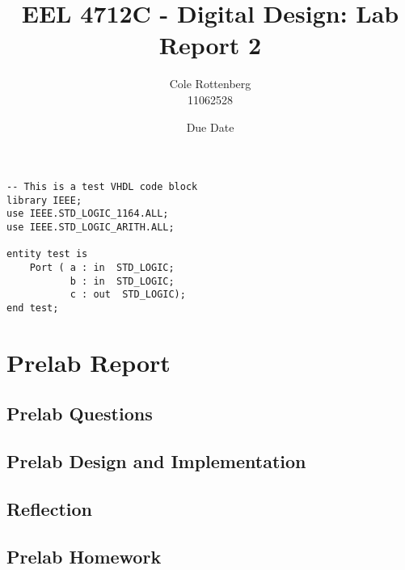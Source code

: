 \documentclass{article}
\title{EEL 4712C - Digital Design: Lab Report 2}
\author{Cole Rottenberg \\ 11062528}
\date{Due Date}
\begin{document}
\maketitle

\begin{lstlisting}[caption=Test VHDL Code, label=lst:test-vhdl-code]
-- This is a test VHDL code block
library IEEE;
use IEEE.STD_LOGIC_1164.ALL;
use IEEE.STD_LOGIC_ARITH.ALL;

entity test is
    Port ( a : in  STD_LOGIC;
           b : in  STD_LOGIC;
           c : out  STD_LOGIC);
end test;
\end{lstlisting}

\section*{Prelab Report}

\subsection*{Prelab Questions}

\subsection*{Prelab Design and Implementation}

\subsection*{Reflection}

\subsection*{Prelab Homework}
\end{document}
